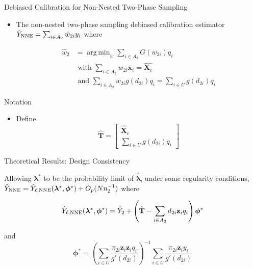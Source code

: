 \documentclass{beamer} %
\DeclareMathOperator*{\argmin}{arg\,min}
\renewcommand{\bf}[1]{\mathbf{#1}}
\begin{document}
\begin{frame}{Debiased Calibration for Non-Nested Two-Phase Sampling}

  \begin{itemize}
    \item The non-nested two-phase sampling debiased calibration estimator 
      $\hat Y_{\rm{NNE}} = \sum_{i \in A_2} \hat w_{2i} y_i$ where 

    \begin{align}\label{eq:nnopt}
      \hat w_2 
      &= \argmin_w \sum_{i \in A_2} G\left(w_{2i}\right) q_i \\ \nonumber
      &\text{ with } 
      \sum_{i \in A_2} w_{2i} \bf x_i = \widehat{\bf X_{c}} \\ \nonumber
      &\text{ and } 
      \sum_{i \in A_2} w_{2i} g(d_{2i}) q_i = \sum_{i \in U} g(d_{2i}) q_i
    \end{align}
  \end{itemize}

\end{frame}

\begin{frame}{Notation}

  \begin{itemize}
    \item Define 
      $$
      \widehat{\bf T} = 
      \begin{bmatrix} 
        \widehat{\bf X}_c \\
        \sum_{i \in U} g(d_{2i}) q_i 
      \end{bmatrix}
      $$
  \end{itemize}

\end{frame}

\begin{frame}{Theoretical Results: Design Consistency}

\begin{theorem}\label{thm:dc2}
  Allowing $\bm \lambda^*$ to be the probability limit of $\hat{\bm \lambda}$,
  under some regularity conditions, $\hat Y_{\rm{NNE}} = \hat Y_{\ell,
  \rm{NNE}}(\bm \lambda^*,
  \bm \phi^*) + O_p(Nn_2^{-1})$ where

  $$\hat Y_{\ell, \rm{NNE}}(\bm \lambda^*, \bm \phi^*) =  \hat Y_{2} 
  + \left(\hat{\bf T} - \sum_{i \in A_2} d_{2i} \bf z_i q_i\right) \bm \phi^*$$

  and 
  $$\bm \phi^* =
  \left(\sum_{i \in U} \frac{\pi_{2i}\bf z_i \bf z_i q_i}{g'(d_{2i})} 
  \right)^{-1}
  \sum_{i \in U} \frac{\pi_{2i} \bf z_i y_i}{g'(d_{2i})} 
  $$
\end{theorem}

\end{frame}
\end{document}
